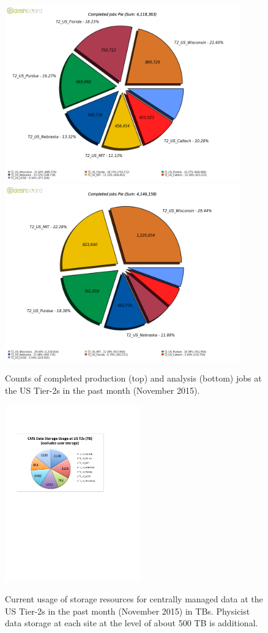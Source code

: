 \documentclass[11pt,a4paper]{article}
\begin{document}
\begin{figure}
\begin{center}
\includegraphics[height=3in]{productionJobsAtUST2sInOneMonth.png}
\includegraphics[height=3in]{analysisJobsAtUST2sInOneMonth.png}
\label{computingJobsAtUST2sInOneMonth}
\end{center}
\caption{Counts of completed production (top) and analysis (bottom) 
jobs at the US Tier-2s in the past month (November 2015).}
\end{figure}

\begin{figure}
\begin{center}
\includegraphics[height=3in]{storageUtilizationAtUST2s-Chart.pdf}
\label{storageUtilizationAtUST2s-Chart}
\end{center}
\caption{Current usage of storage resources for centrally managed
data at the US Tier-2s in the past month (November 2015) in TBs. 
Physicist data storage at each site at the level of about 500 TB
is additional.}
\end{figure}
\end{document}
